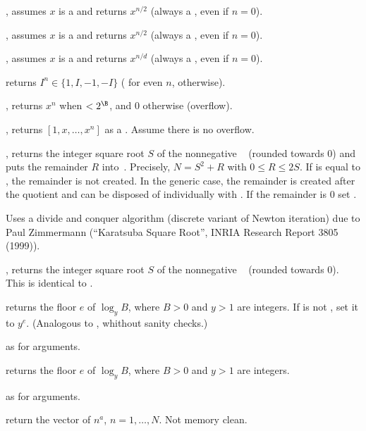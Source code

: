 , assumes $x$ is a  and returns
$x^{n/2}$ (always a , even if $n = 0$).

, assumes $x$ is a  and returns
$x^{n/2}$ (always a , even if $n = 0$).

, assumes $x$ is a  and
returns $x^{n/d}$ (always a , even if $n = 0$).

 returns $I^n\in\{1,I,-1,-I\}$ ( for even $n$,
 otherwise).

, returns $x^n$ when $< 2^\B$, and $0$
otherwise (overflow).

, returns $[1,x,\ldots,x^n]$ as a
. Assume there is no overflow.

, returns the integer square root $S$ of
the nonnegative ~ (rounded towards 0) and puts the remainder
$R$ into~. Precisely, $N = S^2 + R$ with $0\leq R \leq 2S$. If
 is equal to , the remainder is not created. In the generic
case, the remainder is created after the quotient and can be disposed of
individually with . If the remainder is $0$ set .

Uses a divide and conquer algorithm (discrete variant of Newton iteration)
due to Paul Zimmermann (``Karatsuba Square Root'', INRIA Research Report 3805
(1999)).

, returns the integer square root $S$ of
the nonnegative ~ (rounded towards 0). This is identical
to .

returns the floor $e$ of $\log_y B$, where $B > 0$ and $y > 1$ are integers.
If  is not , set it to $y^e$. (Analogous to ,
whithout sanity checks.)

 as  for
 arguments.

 returns the floor $e$ of $\log_y B$, where
$B > 0$ and $y > 1$ are integers.

 as  for
 arguments.

 return the vector of $n^a$, $n = 1,
\dots, N$. Not memory clean.

